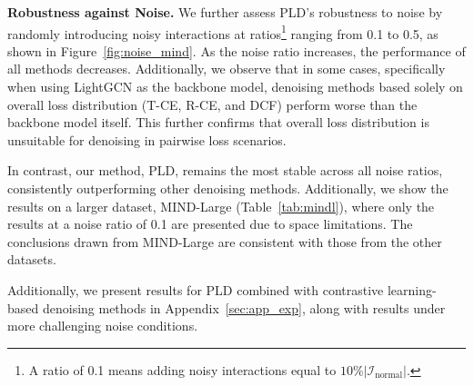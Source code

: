 \textbf{Robustness against Noise.}
We further assess PLD's robustness to noise by randomly introducing noisy interactions at ratios\footnote{A ratio of 0.1 means adding noisy interactions equal to $10\% \vert \mathcal{I}_{\text{normal}} \vert$.} ranging from 0.1 to 0.5, as shown in Figure~\ref{fig:noise_mind}. As the noise ratio increases, the performance of all methods decreases. Additionally, we observe that in some cases, specifically when using LightGCN as the backbone model, denoising methods based solely on overall loss distribution (T-CE, R-CE, and DCF) perform worse than the backbone model itself. This further confirms that overall loss distribution is unsuitable for denoising in pairwise loss scenarios.





In contrast, our method, PLD, remains the most stable across all noise ratios, consistently outperforming other denoising methods.
Additionally, we show the results on a larger dataset, MIND-Large (Table~\ref{tab:mindl}), where only the results at a noise ratio of 0.1 are presented due to space limitations. The conclusions drawn from MIND-Large are consistent with those from the other datasets.

Additionally, we present results for PLD combined with contrastive learning-based denoising methods in Appendix~\ref{sec:app_exp}, along with results under more challenging noise conditions.

